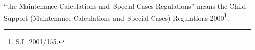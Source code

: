 \documentclass[12pt,a4paper]{article}
\begin{document}
\begin{enumerate}
{“the Maintenance Calculations and~Special Cases Regulations” means the Child Support (Maintenance Calculations and~Special Cases) Regulations 2000\footnote{\frenchspacing S.I.~2001/155.};
}


%


%
%


\end{enumerate}
\end{document}

